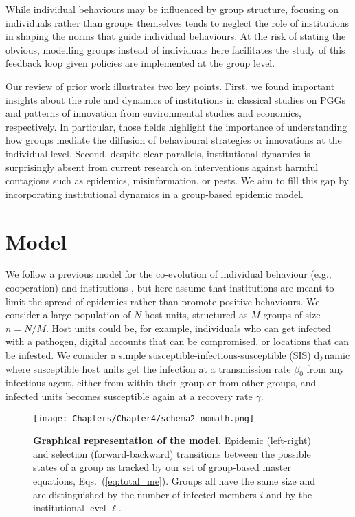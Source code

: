 While individual behaviours may be influenced by group structure, focusing on individuals rather than groups themselves tends to neglect the role of institutions in shaping the norms that guide individual behaviours. At the risk of stating the obvious, modelling groups instead of individuals here facilitates the study of this feedback loop given policies are implemented at the group level.

Our review of prior work illustrates two key points. First, we found important insights about the role and dynamics of institutions in classical studies on PGGs and patterns of innovation from environmental studies and economics, respectively. In particular, those fields highlight the importance of understanding how groups mediate the diffusion of behavioural strategies or innovations at the individual level. Second, despite clear parallels, institutional dynamics is surprisingly absent from current research on interventions against harmful contagions such as epidemics, misinformation, or pests. We aim to fill this gap by incorporating institutional dynamics in a group-based epidemic model. 

\section{Model}
\label{coevo.section.model}

We follow a previous model for the co-evolution of individual behaviour (e.g., cooperation) and institutions \cite{hebert-dufresne_source-sink_2022}, but here assume that institutions are meant to limit the spread of epidemics rather than promote positive behaviours. We consider a large population of $N$ host units, structured as $M$ groups of size $n = N/M$. Host units could be, for example, individuals who can get infected with a pathogen, digital accounts that can be compromised, or locations that can be infested. We consider a simple susceptible-infectious-susceptible (SIS) dynamic where susceptible host units get the infection at a transmission rate $\beta_0$ from any infectious agent, either from within their group or from other groups, and infected units becomes susceptible again at a recovery rate $\gamma$.

\begin{figure*}
  \centering	
    \texttt{[image: Chapters/Chapter4/schema2\_nomath.png]}  
  \caption[Graphical representation of the model for the co-evolution of individual behavior and institutions.]{  \textbf{Graphical representation of the model.}
    Epidemic (left-right) and selection (forward-backward) transitions between the possible states of a group as tracked by our set of group-based master equations, Eqs.~(\ref{eq:total_me}). Groups all have the same size and are distinguished by the number of infected members $i$ and by the institutional level $\ell$.
  }
  \label{fig:cartoon_model}
\end{figure*}

